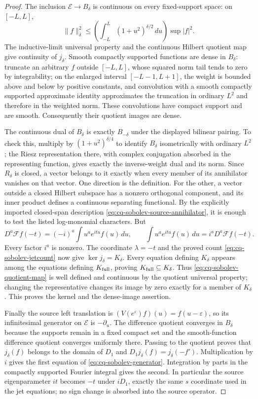 \begin{proof}
The inclusion $\mathcal E\to B_\delta$ is continuous on every
fixed-support space: on $[-L,L]$,
\[
 \|f\|_\delta^2\leq
   \left(\int_{-L}^L(1+u^2)^{\delta/2}\,du\right)\sup|f|^2.
\]
The inductive-limit universal property and the continuous Hilbert
quotient map give continuity of $j_\delta$.
Smooth compactly supported functions are dense in $B_\delta$:
truncate an arbitrary $f$ outside $[-L,L]$, whose squared norm tail
tends to zero by integrability; on the enlarged interval
$[-L-1,L+1]$, the weight is bounded above and below by positive
constants, and convolution with a smooth compactly supported
approximate identity approximates the truncation in ordinary $L^2$
and therefore in the weighted norm. These convolutions have compact
support and are smooth. Consequently their quotient images are dense.

The continuous dual of $B_\delta$ is exactly $B_{-\delta}$ under
the displayed bilinear pairing. To check this, multiply by
$(1+u^2)^{\delta/4}$ to identify $B_\delta$ isometrically with
ordinary $L^2$; the Riesz representation there, with complex
conjugation absorbed in the representing function, gives exactly
the inverse-weight dual and its norm. Since $R_\delta$ is closed,
a vector belongs to it exactly when every member of its annihilator
vanishes on that vector. One direction is the definition. For the
other, a vector outside a closed Hilbert subspace has a nonzero
orthogonal component, and its inner product defines a continuous
separating functional. By the explicitly imported closed-span
description \eqref{eq:cq-sobolev-source-annihilator}, it is enough
to test the listed log-monomial characters. But
\[
 D^a\mathscr Ff(-t)=(-i)^a\int u^a e^{itu}f(u)\,du,
 \qquad
 \int u^a e^{itu}f(u)\,du=i^aD^a\mathscr Ff(-t).
\]
Every factor $i^a$ is nonzero. The coordinate $\lambda=-t$ and
the proved count \eqref{eq:cq-sobolev-jetcount} now give
$\ker j_\delta=K_\delta$. Every equation defining $K_\delta$
appears among the equations defining $K_{\rm full}$, proving
$K_{\rm full}\subseteq K_\delta$. Thus
\eqref{eq:cq-sobolev-quotient-map} is well defined and continuous
by the quotient universal property; changing the representative
changes its image by zero exactly for a member of $K_\delta$.
This proves the kernel and the dense-image assertion.

Finally the source left translation is
$(V(e^\varepsilon)f)(u)=f(u-\varepsilon)$, so its infinitesimal
generator on $\mathcal E$ is $-\partial_u$. The difference quotient
converges in $B_\delta$ because the supports remain in a fixed
compact set and the smooth-function difference quotient converges
uniformly there. Passing to the quotient proves that
$j_\delta(f)$ belongs to the domain of $D_1$ and
$D_1j_\delta(f)=j_\delta(-f')$. Multiplication by $i$ gives the
first equation of \eqref{eq:cq-sobolev-generator}. Integration by
parts in the compactly supported Fourier integral gives the second.
In particular the source eigenparameter $it$ becomes $-t$ under
$iD_1$, exactly the same $s$ coordinate used in the jet equations;
no sign change is absorbed into the source operator.
\end{proof}

